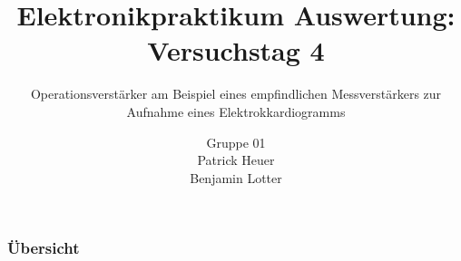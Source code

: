 \documentclass{beamer}
\title{Elektronikpraktikum Auswertung: Versuchstag 4}
\subtitle{Operationsverstärker am Beispiel eines empfindlichen Messverstärkers
zur Aufnahme eines Elektrokkardiogramms}
\author{Gruppe 01 \\ Patrick Heuer \\ Benjamin Lotter}
\date{}
\begin{document}
\maketitle
\begin{frame}
    \frametitle{Übersicht}
    \tableofcontents
\end{frame}








    
\end{document}
